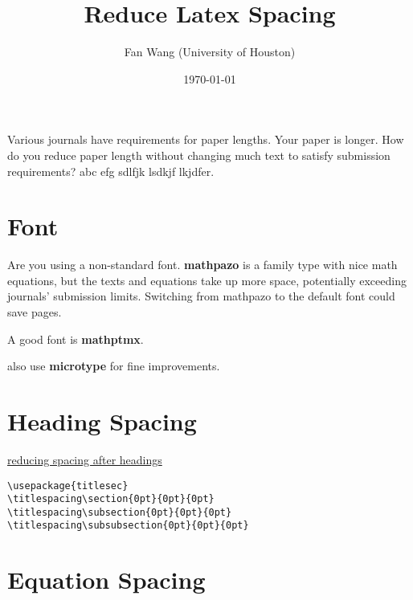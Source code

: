 \documentclass[12pt,english]{article}
\title{Reduce Latex Spacing}
\author{Fan Wang (University of Houston)}
\date{\today}
\begin{document}
\fontsize{9.5}{14}\rm

Various journals have requirements for paper lengths. Your paper is longer. How do you reduce paper length without changing much text to satisfy submission requirements? abc efg sdlfjk lsdkjf lkjdfer.

\section{Font}

Are you using a non-standard font. \textbf{mathpazo} is a family type with nice math equations, but the texts and equations take up more space, potentially exceeding journals' submission limits. Switching from mathpazo to the default font could save pages.

A good font is \textbf{mathptmx}.

also use \textbf{microtype} for fine improvements.

\section{Heading Spacing}

\href{https://tex.stackexchange.com/questions/53338/reducing-spacing-after-headings}{reducing spacing after headings}

\begin{lstlisting}
\usepackage{titlesec}
\titlespacing\section{0pt}{0pt}{0pt}
\titlespacing\subsection{0pt}{0pt}{0pt}
\titlespacing\subsubsection{0pt}{0pt}{0pt}
\end{lstlisting}

\section{Equation Spacing}
\end{document}

